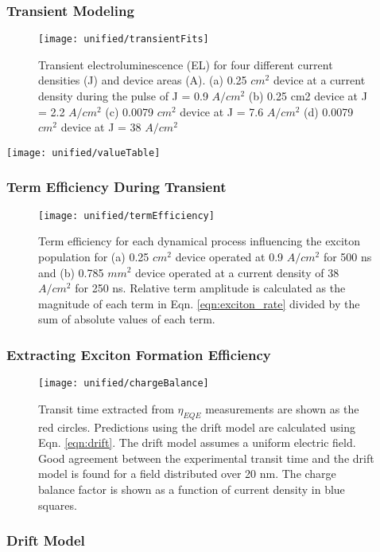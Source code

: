 \documentclass[../thesis.tex]{subfiles}
\begin{document}
\subsubsection{Transient Modeling}
\begin{figure}[h]
\centering
\texttt{[image: unified/transientFits]}
\caption{Transient electroluminescence (EL) for four different current densities (J) and device areas (A). (a) 0.25 $cm^2$ device at a current density during the pulse of J = 0.9 $A/cm^2$ (b) 0.25 cm2
device at J = 2.2 $A/cm^2$ (c) 0.0079 $cm^2$ device at J = 7.6 $A/cm^2$ (d) 0.0079 $cm^2$ device at J = 38 $A/cm^2$}
\label{fig:transientFits}
\end{figure}
\texttt{[image: unified/valueTable]}
\subsubsection{Term Efficiency During Transient}


\begin{figure}[h]
\centering
\texttt{[image: unified/termEfficiency]}
\caption{Term efficiency for each dynamical process influencing the exciton population for (a) 0.25 $cm^2$ device operated at 0.9 $A/cm^2$ for 500 ns and (b) 0.785 $mm^2$ device operated at a current density of 38 $A/cm^2$ for 250 ns. Relative term amplitude is calculated as the magnitude of each term in Eqn. \ref{eqn:exciton_rate} divided by the sum of absolute values of each term.}
\label{fig:termEfficiency}
\end{figure}
\subsubsection{Extracting Exciton Formation Efficiency}
\begin{figure}[h]
\centering
\texttt{[image: unified/chargeBalance]}
\caption{Transit time extracted from $\eta_{EQE}$ measurements are shown as the red circles. Predictions using the drift model are calculated using Eqn. \ref{eqn:drift}. The drift model assumes a uniform electric field. Good agreement between the experimental transit time and the drift model is found for a field distributed over 20 nm. The charge balance factor is shown as a function of current density in blue squares.}
\label{fig:chargeBalance}
\end{figure}
\subsubsection{Drift Model}
\end{document}
